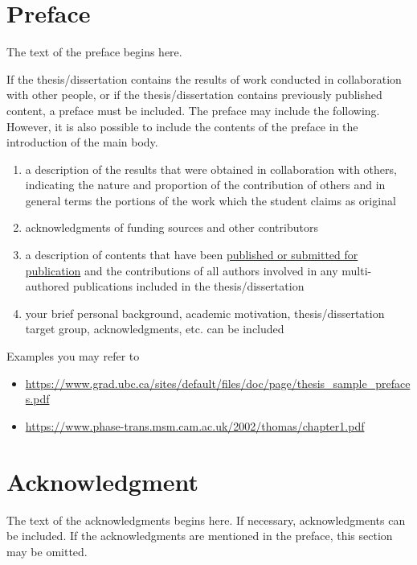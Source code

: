 \documentclass[11pt]{report}
\begin{document}

\newpage
\chapter*{Preface}
\normalsize
The text of the preface begins here. 

If the thesis/dissertation contains the results of work conducted in collaboration with other people, or if the thesis/dissertation contains previously published content, a preface must be included. The preface may include the following. However, it is also possible to include the contents of the preface in the introduction of the main body.\par

\begin{enumerate}
\item a description of the results that were obtained in collaboration with others, indicating the nature and proportion of the contribution of others and in general terms the portions of the work which the student claims as original 
\item acknowledgments of funding sources and other contributors
\item a description of contents that have been \underline{published or submitted for publication} and the contributions of all authors involved in any multi-authored publications included in the thesis/dissertation 
\item your brief personal background, academic motivation, thesis/dissertation target group, acknowledgments, etc. can be included 
\end{enumerate}

\newpage
Examples you may refer to 
\begin{itemize}
\item\url{https://www.grad.ubc.ca/sites/default/files/doc/page/thesis_sample_prefaces.pdf}
\item\url{https://www.phase-trans.msm.cam.ac.uk/2002/thomas/chapter1.pdf}
\end{itemize}

\newpage
\chapter*{Acknowledgment}

The text of the acknowledgments begins here.
If necessary, acknowledgments can be included.
If the acknowledgments are mentioned in the preface, this section may be omitted. 
\end{document}
